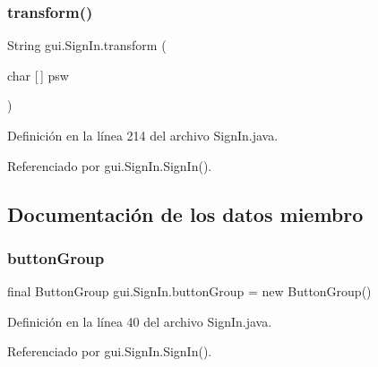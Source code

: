 \subsubsection{\texorpdfstring{transform()}{transform()}}
{\footnotesize\ttfamily String gui.\+Sign\+In.\+transform (\begin{DoxyParamCaption}\item[{char \mbox{[}$\,$\mbox{]}}]{psw }\end{DoxyParamCaption})}



Definición en la línea 214 del archivo Sign\+In.\+java.


\begin{DoxyCode}{0}

\end{DoxyCode}


Referenciado por gui.\+Sign\+In.\+Sign\+In().



\subsection{Documentación de los datos miembro}
\mbox{\label{classgui_1_1_sign_in_afbdae1f60f065dd2b577301caa6926c0}} 
\subsubsection{\texorpdfstring{buttonGroup}{buttonGroup}}
{\footnotesize\ttfamily final Button\+Group gui.\+Sign\+In.\+button\+Group = new Button\+Group()\hspace{0.3cm}{\ttfamily [private]}}



Definición en la línea 40 del archivo Sign\+In.\+java.



Referenciado por gui.\+Sign\+In.\+Sign\+In().

